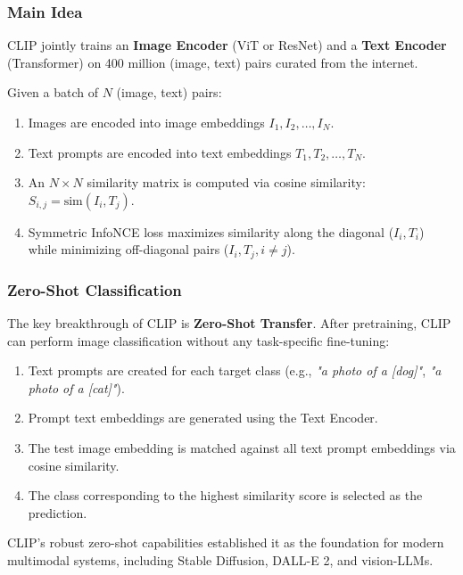 \vspace{5cm}
\subsubsection{Main Idea}

CLIP jointly trains an \textbf{Image Encoder} (ViT or ResNet) and a \textbf{Text Encoder} (Transformer) on 400 million (image, text) pairs curated from the internet.

Given a batch of $N$ (image, text) pairs:
\begin{enumerate}
    \item Images are encoded into image embeddings $I_1, I_2, \dots, I_N$.
    \item Text prompts are encoded into text embeddings $T_1, T_2, \dots, T_N$.
    \item An $N \times N$ similarity matrix is computed via cosine similarity: $S_{i,j} = \text{sim}(I_i, T_j)$.
    \item Symmetric InfoNCE loss maximizes similarity along the diagonal ($I_i, T_i$) while minimizing off-diagonal pairs ($I_i, T_j, i \neq j$).
\end{enumerate}

\subsubsection{Zero-Shot Classification}

The key breakthrough of CLIP is \textbf{Zero-Shot Transfer}. After pretraining, CLIP can perform image classification without any task-specific fine-tuning:
\begin{enumerate}
    \item Text prompts are created for each target class (e.g., \emph{"a photo of a [dog]"}, \emph{"a photo of a [cat]"}).
    \item Prompt text embeddings are generated using the Text Encoder.
    \item The test image embedding is matched against all text prompt embeddings via cosine similarity.
    \item The class corresponding to the highest similarity score is selected as the prediction.
\end{enumerate}

CLIP's robust zero-shot capabilities established it as the foundation for modern multimodal systems, including Stable Diffusion, DALL-E 2, and vision-LLMs.
